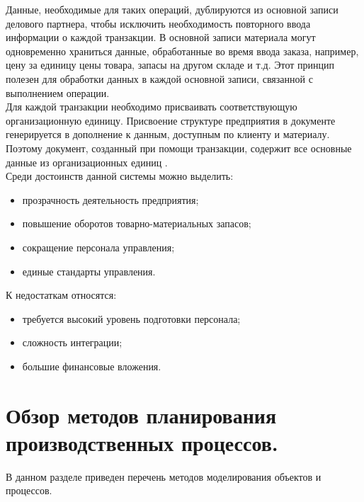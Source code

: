 Данные, необходимые для таких операций, дублируются из основной записи делового партнера, чтобы исключить необходимость повторного ввода информации о каждой транзакции. 
В основной записи материала могут одновременно храниться данные, обработанные во время ввода заказа, например, цену за единицу цены товара, запасы на другом складе и т.д. 
Этот принцип полезен для обработки данных в каждой основной записи, связанной с выполнением операции.\\
\indent Для каждой транзакции необходимо присваивать соответствующую организационную единицу. 
Присвоение структуре предприятия в документе генерируется в дополнение к данным, доступным по клиенту и материалу. 
Поэтому документ, созданный при помощи транзакции, содержит все основные данные из организационных единиц \cite{gehBook}.\\
\indent Среди достоинств данной системы можно выделить:

\begin{itemize}
	\item прозрачность деятельность предприятия;
	\item повышение оборотов товарно-материальных запасов;
	\item сокращение персонала управления;
	\item единые стандарты управления.
\end{itemize}

\indent К недостаткам относятся:

\begin{itemize}
	\item требуется высокий уровень подготовки персонала;
	\item сложность интеграции;
	\item большие финансовые вложения.
\end{itemize}


\section{Обзор методов планирования производственных процессов.}

В данном разделе приведен перечень методов моделирования объектов и процессов.

